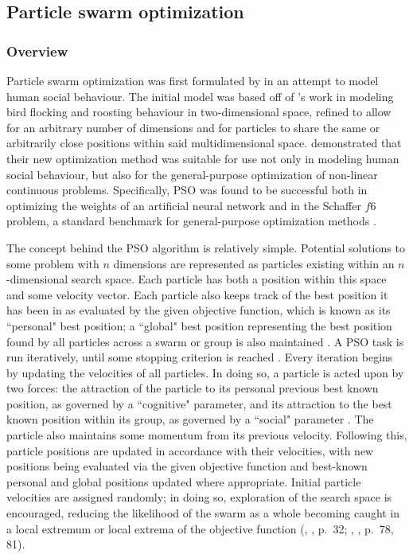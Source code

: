 \documentclass[12pt,a4paper]{article}
\newcommand{\citetwo}[4]{(\citeauthor{#1}, \citeyear{#1}, p.~#2; \citeauthor{#3}, \citeyear{#3}, p.~#4)}
\begin{document}
\subsection{Particle swarm optimization}
\subsubsection{Overview}
Particle swarm optimization was first formulated by \cite{kennedy1995} in an attempt to model human social behaviour. The initial model was based off of \cite{heppner1990}'s work in modeling bird flocking and roosting behaviour in two-dimensional space, refined to allow for an arbitrary number of dimensions and for particles to share the same or arbitrarily close positions within said multidimensional space. \citeauthor{kennedy1995} demonstrated that their new optimization method was suitable for use not only in modeling human social behaviour, but also for the general-purpose optimization of non-linear continuous problems. Specifically, PSO was found to be successful both in optimizing the weights of an artificial neural network and in the Schaffer $f6$ problem, a standard benchmark for general-purpose optimization methods \citep{davis1991}.

The concept behind the PSO algorithm is relatively simple. Potential solutions to some problem with $n$ dimensions are represented as particles existing within an $n$-dimensional search space. Each particle has both a position within this space and some velocity vector. Each particle also keeps track of the best position it has been in as evaluated by the given objective function, which is known as its ``personal" best position; a ``global" best position representing the best position found by all particles across a swarm or group is also maintained \citep{chong2013}. A PSO task is run iteratively, until some stopping criterion is reached \citep[p.~80]{solnon2010}. Every iteration begins by updating the velocities of all particles. In doing so, a particle is acted upon by two forces: the attraction of the particle to its personal previous best known position, as governed by a ``cognitive" parameter, and its attraction to the best known position within its group, as governed by a ``social" parameter \citep{chong2013}. The particle also maintains some momentum from its previous velocity. Following this, particle positions are updated in accordance with their velocities, with new positions being evaluated via the given objective function and best-known personal and global positions updated where appropriate. Initial particle velocities are assigned randomly; in doing so, exploration of the search space is encouraged, reducing the likelihood of the swarm as a whole becoming caught in a local extremum or local extrema of the objective function \citetwo{yang2014}{32}{solnon2010}{78, 81}. 
\end{document}
